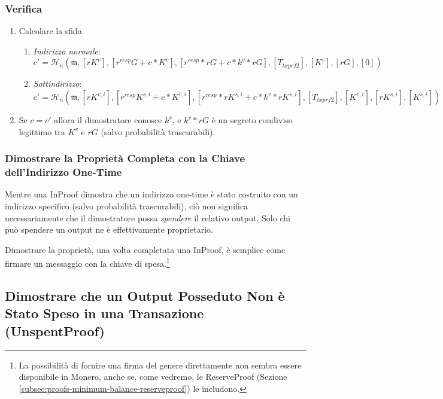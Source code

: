 \subsubsection*{Verifica}

\begin{enumerate}
    \item Calcolare la sfida
    \begin{enumerate}
        \item {\em Indirizzo normale}:\vspace{.145cm}
	    \[c' = \mathcal{H}_n(\mathfrak{m},[rK^v], [r^{resp} G + c*K^v], [r^{resp}*r G + c*k^v*r G], [T_{txprf2}], [K^v], [rG], [0])\]
	    \item {\em Sottindirizzo}:\vspace{.16cm}
	    \[c' = \mathcal{H}_n(\mathfrak{m},[rK^{v,i}], [r^{resp} K^{s,i} + c*K^{v,i}], [r^{resp}*r K^{s,i} + c*k^v*r K^{s,i}], [T_{txprf2}], [K^{v,i}], [r K^{s,i}], [K^{s,i}])\]
    \end{enumerate}
    \item Se $c = c'$ allora il dimostratore conosce $k^v$, e $k^v*r G$ è un segreto condiviso legittimo tra $K^v$ e $r G$ (salvo probabilità trascurabili).
\end{enumerate}

\subsubsection*{Dimostrare la Proprietà Completa con la Chiave dell’Indirizzo One-Time}

Mentre una InProof dimostra che un indirizzo one-time è stato costruito con un indirizzo specifico (salvo probabilità trascurabili), ciò non significa necessariamente che il dimostratore possa {\em spendere} il relativo output. Solo chi può spendere un output ne è effettivamente proprietario.

Dimostrare la proprietà, una volta completata una InProof, è semplice come firmare un messaggio con la chiave di spesa.\footnote{La possibilità di fornire una firma del genere direttamente non sembra essere disponibile in Monero, anche se, come vedremo, le ReserveProof (Sezione \ref{subsec:proofs-minimum-balance-reserveproof}) le includono.}


\subsection{Dimostrare che un Output Posseduto Non è Stato Speso in una Transazione (UnspentProof)}
\label{subsec:proofs-owned-output-spent-unspentproof}

